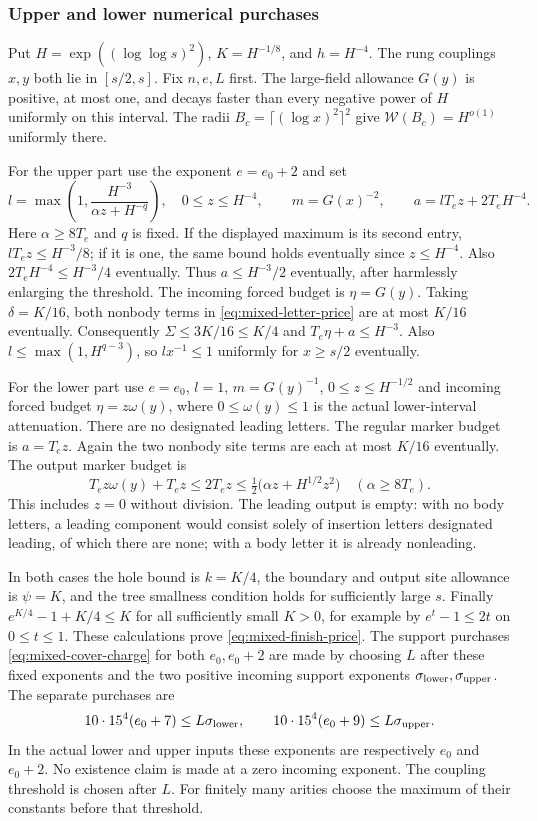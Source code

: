 \subsubsection{Upper and lower numerical purchases}

Put $H=\exp((\log\log s)^2)$, $K=H^{-1/8}$, and $h=H^{-4}$.
The rung couplings $x,y$ both lie in $[s/2,s]$. Fix $n,e,L$ first.
The large-field allowance $G(y)$ is positive, at most one, and decays
faster than every negative power of $H$ uniformly on this interval.
The radii $B_c=\lceil(\log x)^2\rceil^2$ give
$\mathcal W(B_c)=H^{o(1)}$ uniformly there.

For the upper part use the exponent $e=e_0+2$ and set
\[
 l=\max\left(1,\frac{H^{-3}}{\alpha z+H^{-q}}\right),
 \quad 0\le z\le H^{-4},\qquad m=G(x)^{-2},
 \qquad a=lT_ez+2T_eH^{-4}.
\]
Here $\alpha\ge8T_e$ and $q$ is fixed. If the displayed maximum is
its second entry, $lT_ez\le H^{-3}/8$; if it is one, the same bound
holds eventually since $z\le H^{-4}$. Also $2T_eH^{-4}\le H^{-3}/4$
eventually. Thus $a\le H^{-3}/2$ eventually, after harmlessly
enlarging the threshold. The incoming forced budget is $\eta=G(y)$.
Taking $\delta=K/16$, both nonbody terms in
\eqref{eq:mixed-letter-price} are at most $K/16$ eventually.
Consequently $\Sigma\le3K/16\le K/4$ and
$T_e\eta+a\le H^{-3}$. Also $l\le\max(1,H^{q-3})$, so
$l x^{-1}\le1$ uniformly for $x\ge s/2$ eventually.

For the lower part use $e=e_0$, $l=1$, $m=G(y)^{-1}$,
$0\le z\le H^{-1/2}$ and incoming forced budget
$\eta=z\omega(y)$, where $0\le\omega(y)\le1$ is the actual
lower-interval attenuation. There are no designated leading letters.
The regular marker budget is $a=T_ez$. Again the two nonbody site
terms are each at most $K/16$ eventually. The output marker budget is
\[
 T_ez\omega(y)+T_ez\le2T_ez
       \le\tfrac12\bigl(\alpha z+H^{1/2}z^2\bigr)
                  \quad(\alpha\ge8T_e).
\]
This includes $z=0$ without division. The leading output is empty:
with no body letters, a leading component would consist solely of
insertion letters designated leading, of which there are none; with a
body letter it is already nonleading.

In both cases the hole bound is $k=K/4$, the boundary and output
site allowance is $\psi=K$, and the tree smallness condition holds
for sufficiently large $s$. Finally
$e^{K/4}-1+K/4\le K$ for all sufficiently small $K>0$, for example
by $e^t-1\le2t$ on $0\le t\le1$. These calculations prove
\eqref{eq:mixed-finish-price}. The support purchases
\eqref{eq:mixed-cover-charge} for both $e_0,e_0+2$ are made by
choosing $L$ after these fixed exponents and the two positive incoming
support exponents $\sigma_{\rm lower},\sigma_{\rm upper}$. The
separate purchases are
\[
 10\cdot15^4(e_0+7)\le L\sigma_{\rm lower},\qquad
 10\cdot15^4(e_0+9)\le L\sigma_{\rm upper}.
\]
In the actual lower and upper inputs these exponents are respectively
$e_0$ and $e_0+2$. No existence claim is made at a zero incoming
exponent. The coupling threshold is chosen after $L$. For finitely many arities choose the maximum of
their constants before that threshold.


